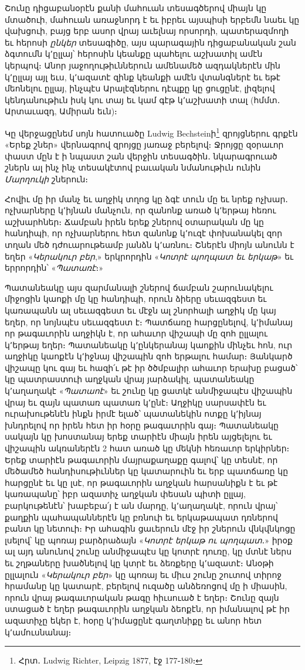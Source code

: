 \documentclass{article}
\begin{document}
{Շունը դիցաբանօրէն քանի մահուան տեսագծերով միայն կը մտածուի, մահուան առաջնորդ է եւ իբրեւ այսպիսի երբեմն նաեւ կը վախցուի, բայց երբ ասոր վրայ աւելնայ որսորդի, պատերազմողի եւ հերոսի \emph{ընկեր} տեսագիծը, այս պարագային դիցաբանական շան ձգտումն կ՚ըլլայ՝ հերոսին կեանքը պահելու աշխատիլ ամէն կերպով։ Անոր յաջողութիւններուն ամենամեծ ազդակներէն մին կ՚ըլլայ այլ եւս, կ՚ազատէ զինք կեանքի ամէն վտանգներէ եւ եթէ մեոնելու ըլլայ, ինչպէս Արալէզներու դէպքը կը ցուցընէ, լիզելով կենդանութիւն իսկ կու տայ եւ կամ գէթ կ՚աշխատի տալ (հմմտ․ Արտաւազդ, Ամիրան եւն)։

Կը վերջացընեմ սոյն հատուածը Ludwig Bechsteinի\footnote{Հրտ․ Ludwig Richter, Leipzig 1877, էջ 177֊180։} զրոյցներու գրքէն «Երեք շներ» վերնագրով զրոյցը յառաջ բերելով։ Ջրոյցը զօրաւոր փաստ մըն է ի նպաստ շան վերջին տեսագծին․ նկարագրուած շներն ալ ինչ ինչ տեսակէտով բաւական նմանութիւն ունին \emph{Մարղուկի} շներուն։

Հովիւ մը իր մանչ եւ աղջիկ տղոց կը ձգէ տուն մը եւ նրեք ոչխար․ ոչխարները կ՚իյնան մանչուն, որ զանոնք առած կ՚երթայ հեռու աշխարհներ։ Ճամբան իրեն երեք շներով օտարական մը կը հանդիպի, որ ոչխարներու հետ զանոնք կ՚ուզէ փոխանակել զոր տղան մեծ դժուարութեամբ յանձն կ՚առնու։ Շներէն միոյն անունն է եղեր «\emph{Կերակուր բեր},» երկրորդին «\emph{Կոտրէ պողպատ եւ երկաթ}» եւ երրորդին՝ «\emph{Պատառէ}։»

Պատանեակը այս զարմանալի շներով ճամբան շարունակելու միջոցին կաոքի մը կը հանդիպի, որուն ձիերը սեւազգեստ եւ կառապանն ալ սեւազգեստ եւ մէջն ալ շնորհալի աղջիկ մը կայ եղեր, որ նոյնպէս սեւազգեստ է։ Պատճառը հարցընելով, կ՚իմանայ որ թագաւորին աղջիկն է, որ ահաւոր վիշապի մը զոհ ըլլալու կ՚երթայ եղեր։ Պատանեակը կ՚ընկերանայ կաոքին մինչեւ հոն, ուր աղջիկը կաոքէն կ՚իջնայ վիշապին զոհ երթալու համար։ Յանկարծ վիշապը կու գայ եւ հազի՛ւ թէ իր ծծմբալիր ահաւոր երախը բացած՝ կը պատրաստուի աղջկան վրայ յարձակիլ, պատանեակը կ՚աղաղակէ «\emph{Պատաոէ}» եւ շունը կը ցատկէ անմիջապէս վիշապին վրայ եւ զայն պատառ պատառ կ՚ընէ։ Աղջիկը սարսափէն եւ ուրախութենէն ինքն իրմէ ելած՝ պատանեկին ոտքը կ՚իյնայ խնդրելով որ իրեն հետ իր հօրը թագաւորին գայ։ Պատանեակը սակայն կը խոստանայ երեք տարիէն միայն իրեն այցելելու եւ վիշապին ակռաներէն 2 հատ առած կը մեկնի հեռաւոր երկիրներ։ Երեք տարիէն թագաւորին մայրաքաղաքը գալով՝ կը տեսնէ, որ մեծամեծ հանդիսութիւններ կը կատարուին եւ երբ պատճառը կը հարցընէ եւ կը լսէ, որ թագաւորին աղջկան հարսանիքն է եւ թէ կառապանը՝ իբր ազատիչ աղջկան փեսան պիտի ըլլայ, բարկութենէն՝ խաբեբա՛յ է ան մարդը, կ՚աղաղակէ, որուն վրայ՝ քաղքին պահապաններէն կը բռնուի եւ երկաթապատ դռներով բանտ կը նետուի։ Իր ահագին ցաւերուն մէջ իր շներուն վնկվնկոցը լսելով՝ կը պոռայ բարձրաձայն «\emph{Կոտրէ երկաթ ու պողպատ}․» իրօք ալ այդ անունով շունը անմիջապէս կը կոտրէ դուռը, կը մտնէ ներս եւ շղթաները խածնելով կը կտրէ եւ ձեռքերը կ՚ազատէ։ Անօթի ըլլալուն «\emph{Կերակուր բեր}» կը պոռայ եւ միւս շունը շուտով տիրոջ հրամանը կը կատարէ, բերելով ուզածը անձեռոցով մը ի միասին, որուն վրայ թագաւորական թագը հիւսուած է եղեր։ Շունը զայն ստացած է եղեր թագաւորին աղջկան ձեոքէն, որ իմանալով թէ իր ազատիչը եկեր է, հօրը կ՚իմացընէ գաղտնիքը եւ անոր հետ կ՚ամուսնանայ։

}
\end{document}
